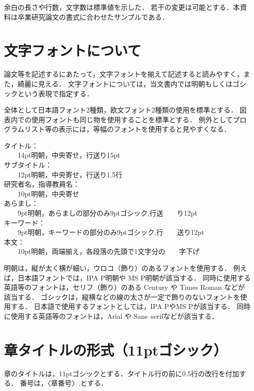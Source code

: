 \documentclass[twocolumn,fleqn]{jsarticle}
\begin{document}
余白の長さや行数，文字数は標準値を示した．
若干の変更は可能とする．本資料は卒業研究論文の書式に合わせたサンプルである．

\section{文字フォントについて}
論文等を記述するにあたって，文字フォントを揃えて記述すると読みやすく，また，綺麗に見える．
文字フォントについては，当文書内では明朝もしくはゴシックという表現で指定する．

全体として日本語フォント2種類，欧文フォント2種類の使用を標準とする．
図表内での使用フォントも同じ物を使用することを標準とする．
例外としてプログラムリスト等の表示には，等幅のフォントを使用すると見やすくなる．
\begin{flushleft}
タイトル：\\
　　14pt明朝，中央寄せ，行送り15pt\\
サブタイトル：\\
　　12pt明朝，中央寄せ，行送り1.5行\\
研究者名，指導教員名：\\
　　10pt明朝，中央寄せ\\
あらまし：\\
　　9pt明朝，あらましの部分のみ9ptゴシック,行送　　り12pt\\
キーワード：\\
　　9pt明朝，キーワードの部分のみ9ptゴシック,行　　送り12pt\\
本文：\\
　　10pt明朝，両端揃え，各段落の先頭で1文字分の　　字下げ
\end{flushleft}

明朝は，縦が太く横が細い，ウロコ（飾り）のあるフォントを使用する．
例えば，日本語フォントでは，IPA P明朝や MS P明朝が該当する．
同時に使用する英語等のフォントは，セリフ（飾り）のある Century や Times Roman などが該当する．
ゴシックは，縦横などの線の太さが一定で飾りのないフォントを使用する．
日本語で使用するフォントとしては，\textsf{IPA P}や\textsf{MS P}が該当する．
同時に使用する英語等のフォントは，\textsf{Arial} や \textsf{Sans--serif}などが該当する\cite{奥村}．

\section{章タイトルの形式（11ptゴシック）}
章のタイトルは，11ptゴシックとする．タイトル行の前に0.5行の改行を付加する．
番号は，〈章番号〉.とする．
\end{document}
